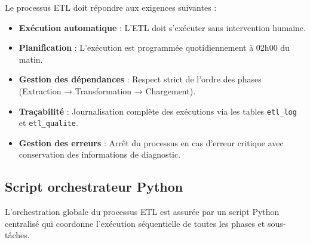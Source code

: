 \documentclass[12pt,a4paper]{report}
\begin{document}
Le processus ETL doit répondre aux exigences suivantes :

\begin{itemize}
    \item \textbf{Exécution automatique} : L’ETL doit s’exécuter sans intervention humaine.
    \item \textbf{Planification} : L’exécution est programmée quotidiennement à 02h00 du matin.
    \item \textbf{Gestion des dépendances} : Respect strict de l’ordre des phases (Extraction → Transformation → Chargement).
    \item \textbf{Traçabilité} : Journalisation complète des exécutions via les tables \texttt{etl\_log} et \texttt{etl\_qualite}.
    \item \textbf{Gestion des erreurs} : Arrêt du processus en cas d’erreur critique avec conservation des informations de diagnostic.
\end{itemize}

\subsection{Script orchestrateur Python}

L’orchestration globale du processus ETL est assurée par un script Python centralisé qui coordonne l’exécution séquentielle de toutes les phases et sous-tâches.
\end{document}
